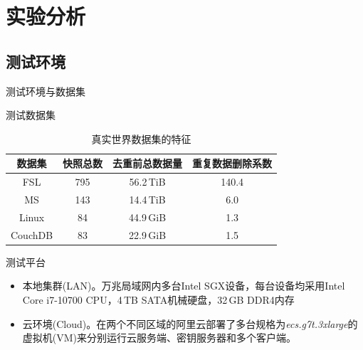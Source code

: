 \documentclass{beamer}
\begin{document}
\section{实验分析}

\subsection{测试环境}

\begin{frame}{测试环境与数据集}
    \begin{textbox}{测试数据集}
        \vspace{-1em}
        \begin{table}[!htb]
            \small
            \centering
            \caption{真实世界数据集的特征}
            \label{tab:featurespy-datasets}
            \begin{tabular}{cccc}
                \toprule
                {\bf 数据集} & {\bf 快照总数} & {\bf 去重前总数据量} & {\bf 重复数据删除系数} \\
                \midrule
                FSL          & 795            & 56.2\,TiB            & 140.4                  \\
                MS           & 143            & 14.4\,TiB            & 6.0                    \\
                Linux        & 84             & 44.9\,GiB            & 1.3                    \\
                CouchDB      & 83             & 22.9\,GiB            & 1.5                    \\
                \bottomrule
            \end{tabular}
        \end{table}
    \end{textbox}

    \begin{textbox}{测试平台}
        \begin{itemize}
            \item 本地集群(LAN)。万兆局域网内多台Intel SGX设备，每台设备均采用Intel Core i7-10700 CPU，4\,TB SATA机械硬盘，32\,GB DDR4内存
            \item 云环境(Cloud)。在两个不同区域的阿里云部署了多台规格为\textit{ecs.g7t.3xlarge}的虚拟机(VM)来分别运行云服务端、密钥服务器和多个客户端。
        \end{itemize}
    \end{textbox}
\end{frame}
\end{document}
